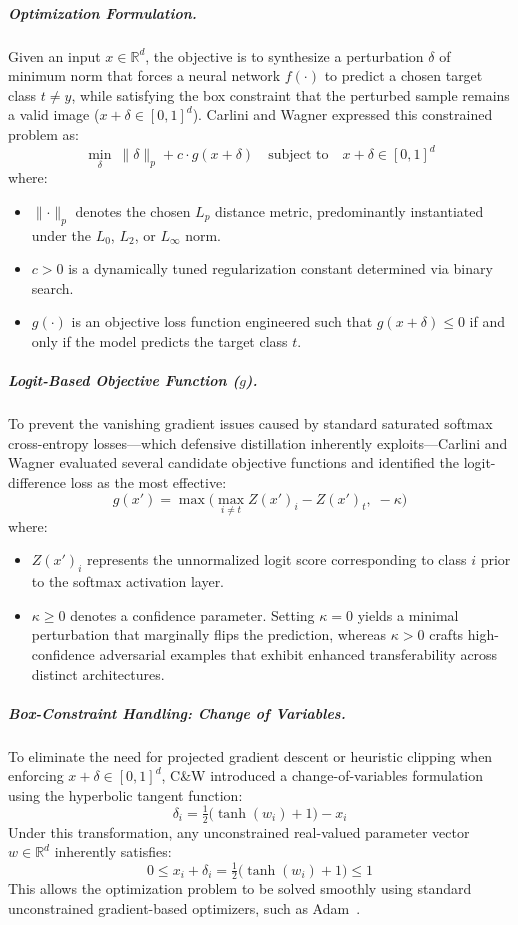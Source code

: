 \documentclass[12pt]{article}
\begin{document}
\subparagraph{Optimization Formulation.} Given an input $x \in \mathbb{R}^d$, the objective is to synthesize a perturbation $\delta$ of minimum norm that forces a neural network $f(\cdot)$ to predict a chosen target class $t \neq y$, while satisfying the box constraint that the perturbed sample remains a valid image ($x + \delta \in [0,1]^d$). Carlini and Wagner expressed this constrained problem as:
\begin{equation}
  \min_{\delta}\ \lVert \delta \rVert_p + c \cdot g(x+\delta) \quad \text{subject to} \quad x + \delta \in [0,1]^d
\end{equation}
where:
\begin{itemize}
  \item $\lVert \cdot \rVert_p$ denotes the chosen $L_p$ distance metric, predominantly instantiated under the $L_0$, $L_2$, or $L_\infty$ norm.
  \item $c > 0$ is a dynamically tuned regularization constant determined via binary search.
  \item $g(\cdot)$ is an objective loss function engineered such that $g(x+\delta) \le 0$ if and only if the model predicts the target class $t$.
\end{itemize}

\subparagraph{Logit-Based Objective Function ($g$).} To prevent the vanishing gradient issues caused by standard saturated softmax cross-entropy losses---which defensive distillation inherently exploits---Carlini and Wagner evaluated several candidate objective functions and identified the logit-difference loss as the most effective:
\begin{equation}
  g(x') = \max\!\Big(\max_{i \neq t} Z(x')_i - Z(x')_t,\; -\kappa\Big)
\end{equation}
where:
\begin{itemize}
  \item $Z(x')_i$ represents the unnormalized logit score corresponding to class $i$ prior to the softmax activation layer.
  \item $\kappa \ge 0$ denotes a confidence parameter. Setting $\kappa = 0$ yields a minimal perturbation that marginally flips the prediction, whereas $\kappa > 0$ crafts high-confidence adversarial examples that exhibit enhanced transferability across distinct architectures.
\end{itemize}

\subparagraph{Box-Constraint Handling: Change of Variables.} To eliminate the need for projected gradient descent or heuristic clipping when enforcing $x + \delta \in [0,1]^d$, C\&W introduced a change-of-variables formulation using the hyperbolic tangent function:
\begin{equation}
  \delta_i = \tfrac{1}{2}\big(\tanh(w_i) + 1\big) - x_i
\end{equation}
Under this transformation, any unconstrained real-valued parameter vector $w \in \mathbb{R}^d$ inherently satisfies:
\begin{equation}
  0 \le x_i + \delta_i = \tfrac{1}{2}\big(\tanh(w_i) + 1\big) \le 1
\end{equation}
This allows the optimization problem to be solved smoothly using standard unconstrained gradient-based optimizers, such as Adam~\cite{kingma2015}.
\end{document}
